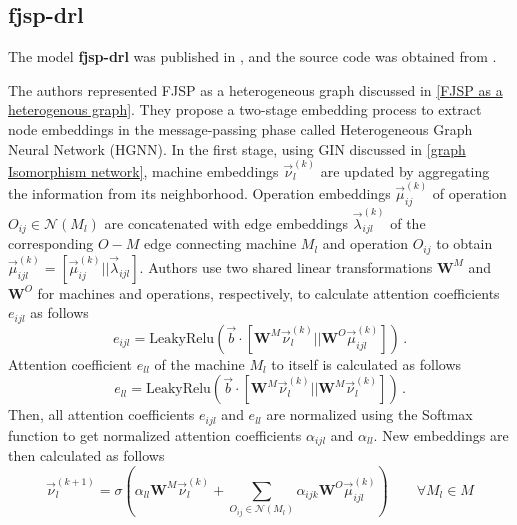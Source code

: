 \subsection{fjsp-drl}

The model \textbf{fjsp-drl} was published in \cite{9826438}, and the source code was obtained from \cite{github_fjsp_drl}.
\par
The authors represented FJSP as a heterogeneous graph discussed in \ref{FJSP as a heterogenous graph}. They propose a two-stage embedding process to extract node embeddings in the message-passing phase called Heterogeneous Graph Neural Network (HGNN). In the first stage, using GIN discussed in \ref{graph Isomorphism network}, machine embeddings $\vec{\nu}_l^{(k)}$ are updated by aggregating the information from its neighborhood. Operation embeddings $\vec{\mu}_{ij}^{(k)}$ of operation $O_{ij} \in \mathcal{N}(M_l)$ are concatenated with edge embeddings $\vec{\lambda}_{ijl}^{(k)}$ of the corresponding $O-M$ edge connecting machine $M_l$ and operation $O_{ij}$ to obtain $\vec{\mu}_{ijl}^{(k)} = \left [ \vec{\mu}_{ij}^{(k)}||\vec{\lambda}_{ijl}\right ]$. Authors use two shared linear transformations $\boldsymbol{W}^M$ and $\boldsymbol{W}^O$ for machines and operations, respectively, to calculate attention coefficients $e_{ijl}$ as follows \cite{9826438}
\begin{equation}
    e_{ijl} = \text{LeakyRelu}\left (\vec{b} \cdot \left [ \boldsymbol{W}^M \vec{\nu}_l^{(k)} || \boldsymbol{W}^O \vec{\mu}_{ijl}^{(k)} \right ]\right ) \, .
\end{equation}
Attention coefficient $e_{ll}$ of the machine $M_l$ to itself is calculated as follows \cite{9826438}
\begin{equation}
    e_{ll} = \text{LeakyRelu}\left (\vec{b} \cdot \left [ \boldsymbol{W}^M \vec{\nu}_l^{(k)} || \boldsymbol{W}^M \vec{\nu}_l^{(k)} \right ]\right ) \, .
\end{equation}
Then, all attention coefficients $e_{ijl}$ and $e_{ll}$ are normalized using the Softmax function to get normalized attention coefficients $\alpha_{ijl}$ and $\alpha_{ll}$. New embeddings are then calculated as follows \cite{9826438}
\begin{equation}
    \vec{\nu}_l^{(k+1)} = \sigma \left ( \alpha_{ll} \boldsymbol{W}^M \vec{\nu}_l^{(k)} + \sum_{O_{ij} \in \mathcal{N}(M_l)} \alpha_{ijk} \boldsymbol{W}^O\vec{\mu}_{ijl}^{(k)}\right ) \hspace{2em} \forall M_l \in M
\end{equation}
\par
